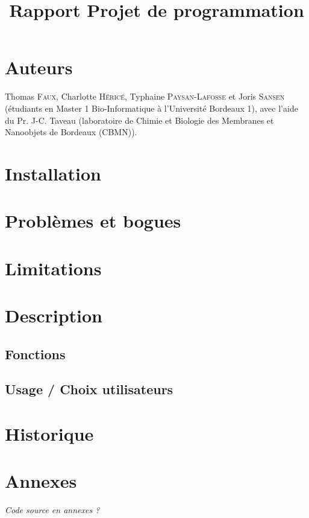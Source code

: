 \documentclass[12pt,a4paper]{article}
\title{Rapport Projet de programmation}
\begin{document}

\newcommand{\cme}{cryo-MET}
\newcommand{\java}{Java~{\tiny \texttrademark}}
\newcommand{\js}{JavaScript}
\newcommand{\imj}{ImageJ}


\tableofcontents
\newpage

\section{Auteurs}

Thomas \textsc{Faux}, Charlotte \textsc{Héricé}, Typhaine \textsc{Paysan-Lafosse} et Joris \textsc{Sansen} (étudiants en Master 1 Bio-Informatique à l'Université Bordeaux 1), avec l'aide du Pr. J-C. Taveau (laboratoire de Chimie et Biologie des Membranes et Nanoobjets de Bordeaux (CBMN)).

\section{Installation}



\section{Problèmes et bogues}



\section{Limitations}



\section{Description}



\subsection{Fonctions}



\subsection{Usage / Choix utilisateurs}



\section{Historique}


\newpage
\section*{Annexes}

\textit{Code source en annexes ?}
\end{document}
